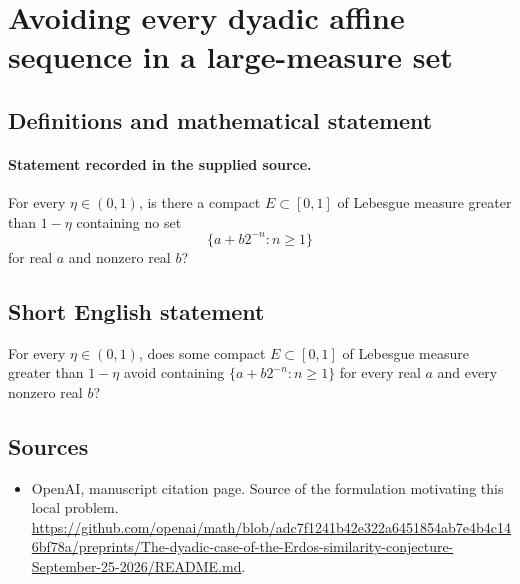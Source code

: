 \documentclass[11pt]{article}
\begin{document}
\section*{Avoiding every dyadic affine sequence in a large-measure set}\label{statement}
\subsection{Definitions and mathematical statement}
\paragraph{Statement recorded in the supplied source.}
For every $\eta\in(0,1)$, is there a compact $E\subset[0,1]$ of Lebesgue measure greater than $1-\eta$ containing no set
\[
\{a+b2^{-n}:n\geq1\}
\]
for real $a$ and nonzero real $b$?
\subsection{Short English statement}
For every $\eta\in(0,1)$, does some compact $E\subset[0,1]$ of Lebesgue measure greater than $1-\eta$ avoid containing $\{a+b2^{-n}:n\geq1\}$ for every real $a$ and every nonzero real $b$?
\subsection{Sources}
\begin{itemize}
\item[S1] OpenAI, manuscript citation page. Source of the formulation motivating this local problem.
\url{https://github.com/openai/math/blob/adc7f1241b42e322a6451854ab7e4b4c146bf78a/preprints/The-dyadic-case-of-the-Erdos-similarity-conjecture-September-25-2026/README.md}.
\end{itemize}
\end{document}
